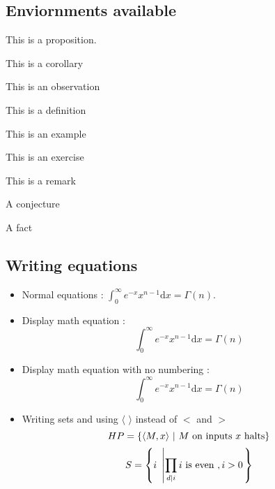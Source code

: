 \subsection{Enviornments available}
\begin{proposition}
This is a proposition.
\end{proposition}
\begin{corollary}
	This is a corollary
\end{corollary}
\begin{observation}
	This is an observation
\end{observation}
\begin{definition}
	This is a definition
\end{definition}
\begin{example}
	This is an example
\end{example}
\begin{exercise}
	This is an exercise
\end{exercise}
\begin{remark}
	This is a remark
\end{remark}
\begin{conjecture}
	A conjecture
\end{conjecture}

\begin{fact}
	A fact
\end{fact}


\subsection{Writing equations}
\begin{itemize}
\item Normal equations : 
	$\int_0^\infty e^{-x} x^{n-1} \mathrm{d}x = \Gamma(n)$.
\item Display math equation : 
	\begin{equation}
	\int_0^\infty e^{-x} x^{n-1} \mathrm{d}x = \Gamma(n)
	\end{equation}
\item Display math equation with no numbering : 
	\begin{equation*}
	\int_0^\infty e^{-x} x^{n-1} \mathrm{d}x = \Gamma(n)
	\end{equation*}
\item Writing sets and using $\langle$ $\rangle$ instead of $<$ and $>$
	\begin{equation}
	HP = {\left\{  \langle M,x \rangle ~|~ \text{$M$ on inputs $x$ halts}  \right\}}
	\end{equation}
	\begin{equation}
	S =  {\left\{  i ~\left |  \prod_{d | i} i \text{ is even }, i > 0 \right .  \right\}}
	\end{equation}
\end{itemize}


